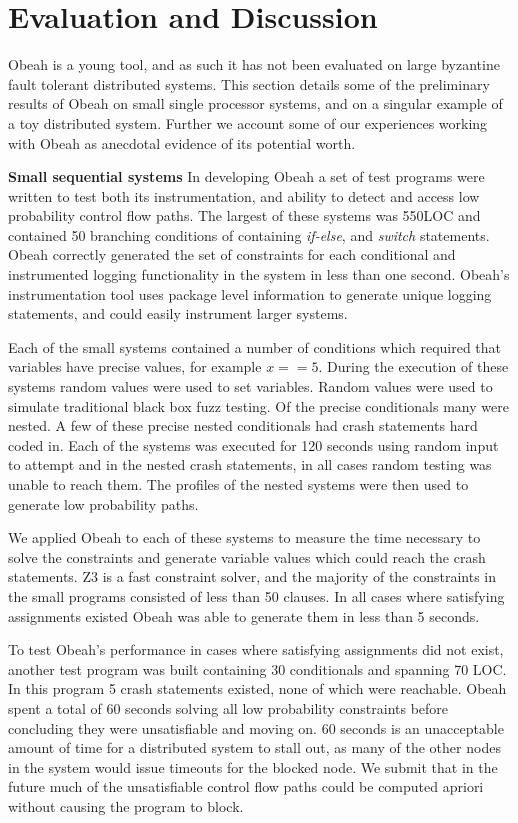 \section{Evaluation and Discussion}
\label{sec:evaluation}

Obeah is a young tool, and as such it has not been evaluated on large byzantine
fault tolerant distributed systems. This section details some of the preliminary
results of Obeah on small single processor systems, and on a singular example
of a toy distributed system. Further we account some of our experiences
working with Obeah as anecdotal evidence of its potential worth.

\noindent\textbf{Small sequential systems} In developing Obeah a set of test
programs were written to test both its instrumentation, and ability to detect
and access low probability control flow paths. The largest of these systems was
550LOC and contained 50 branching conditions of containing \emph{if-else}, and
\emph{switch} statements. Obeah correctly generated the set of constraints for
each conditional and instrumented logging functionality in the system in less
than one second. Obeah's instrumentation tool uses package level information to
generate unique logging statements, and could easily instrument larger systems.

Each of the small systems contained a number of conditions which required that
variables have precise values, for example \emph{$x == 5$}. During the
execution of these systems random values were used to set variables. Random
values were used to simulate traditional black box fuzz testing. Of the precise
conditionals many were nested. A few of these precise nested conditionals had
crash statements hard coded in. Each of the systems was executed for 120
seconds using random input to attempt and in the nested crash statements, in
all cases random testing was unable to reach them. The profiles of the nested
systems were then used to generate low probability paths.

We applied Obeah to each of these systems to measure the time necessary to
solve the constraints and generate variable values which could reach the crash
statements. Z3 is a fast constraint solver, and the majority of the constraints
in the small programs consisted of less than 50 clauses. In all cases where
satisfying assignments existed Obeah was able to generate them in less than 5
seconds.

To test Obeah's performance in cases where satisfying assignments did not exist,
another test program was built containing 30 conditionals and spanning 70 LOC.
In this program 5 crash statements existed, none of which were reachable. Obeah
spent a total of 60 seconds solving all low probability constraints before
concluding they were unsatisfiable and moving on. 60 seconds is an unacceptable
amount of time for a distributed system to stall out, as many of the other
nodes in the system would issue timeouts for the blocked node. We submit that
in the future much of the unsatisfiable control flow paths could be computed
apriori without causing the program to block.

